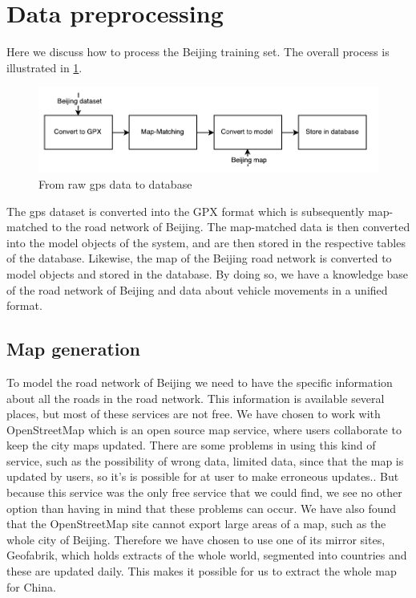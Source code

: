 \section{Data preprocessing}
Here we discuss how to process the Beijing training set. The overall process is illustrated in \ref{fig:data-processing}.

\begin{figure}[h!]
  \centering
    \includegraphics[width=1\textwidth]{figures/data-processing.pdf}
    \caption{From raw gps data to database}
    \label{fig:data-processing}
\end{figure}

The gps dataset is converted into the GPX format which is subsequently map-matched to the road network of Beijing. The map-matched data is then converted into the model objects of the system, and are then stored in the respective tables of the database. Likewise, the map of the Beijing road network is converted to model objects and stored in the database. By doing so, we have a knowledge base of the road network of Beijing and data about vehicle movements in a unified format. 

\subsection{Map generation}%
To model the road network of Beijing we need to have the specific information about all the roads in the road network. This information is available several places, but most of these services are not free. We have chosen to work with OpenStreetMap which is an open source map service, where users collaborate to keep the city maps updated. There are some problems in using this kind of service, such as the possibility of wrong data, limited data, since that the map is updated by users, so it's is possible for at user to make erroneous updates.. But because this service was the only free service that we could find, we see no other option than having in mind that these problems can occur. We have also found that the OpenStreetMap site cannot export large areas of a map, such as the whole city of Beijing. Therefore we have chosen to use one of its mirror sites, Geofabrik, which holds extracts of the whole world, segmented into countries and these are updated daily. This makes it possible for us to extract the whole map for China.

